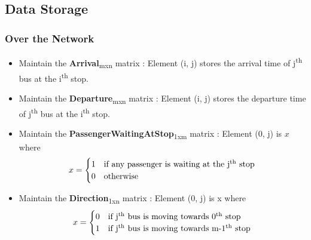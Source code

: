 \subsection{Data Storage}
\subsubsection{Over the Network}

\begin{itemize}

\item Maintain the \textbf{Arrival}\textsubscript{mxn} matrix : Element (i, j) stores the arrival time of j\textsuperscript{th} bus at the i\textsuperscript{th} stop.
\item Maintain the \textbf{Departure}\textsubscript{mxn} matrix : Element (i, j) stores the departure time of j\textsuperscript{th} bus at the i\textsuperscript{th} stop.
\item Maintain the \textbf{PassengerWaitingAtStop}\textsubscript{1xm} matrix : Element (0, j) is $x$ where
 \[ x = \begin{cases} \mbox{1} & \mbox{if any passenger is waiting at the j\textsuperscript{th} stop}  \\ \mbox{0} & \mbox{otherwise} \end{cases} \]
\item Maintain the \textbf{Direction}\textsubscript{1xn} matrix : Element (0, j) is x where
 \[ x = \begin{cases} \mbox{0} & \mbox{if j\textsuperscript{th} bus is moving towards 0\textsuperscript{th} stop}  \\ \mbox{1} & \mbox{if j\textsuperscript{th} bus is moving towards m-1\textsuperscript{th} stop} \end{cases} \]


\end{itemize}